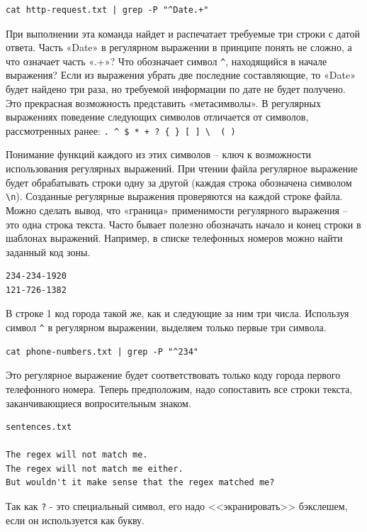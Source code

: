 \documentclass[12pt]{article}
\begin{document}
\begin{verbatim}
cat http-request.txt | grep -P "^Date.+"
\end{verbatim}

При выполнении эта команда найдет и распечатает требуемые три строки с
датой ответа. Часть «Date» в регулярном выражении в принципе понять
не сложно, а что означает часть «.+»? Что обозначает символ
\texttt{\^{}}, находящийся в начале выражения? Если из выражения убрать
две последние составляющие, то «Date» будет найдено три раза, но
требуемой информации по дате не будет получено. Это прекрасная
возможность представить «метасимволы». В регулярных выражениях поведение
следующих символов отличается от символов, рассмотренных ранее:
\texttt{.\ \^{}\ \$\ *\ +\ ?\ \{\ \}\ {[}\ {]}\ \textbackslash{}\ \textbar{}\ (\ )}

Понимание функций каждого из этих символов -- ключ к возможности
использования регулярных выражений. При чтении файла регулярное
выражение будет обрабатывать строки одну за другой (каждая строка
обозначена символом \texttt{\textbackslash{}n}). Созданные регулярные
выражения проверяются на каждой строке файла. Можно сделать вывод, что
«граница» применимости регулярного выражения -- это одна строка текста.
Часто бывает полезно обозначать начало и конец строки в шаблонах
выражений. Например, в списке телефонных номеров можно найти заданный
код зоны.

\begin{verbatim}
234-234-1920
121-726-1382
\end{verbatim}

В строке 1 код города такой же, как и следующие за ним три числа.
Используя символ \texttt{\^{}} в регулярном выражении, выделяем только
первые три символа.

\begin{verbatim}
cat phone-numbers.txt | grep -P "^234"
\end{verbatim}

Это регулярное выражение будет соответствовать только коду города
первого телефонного номера. Теперь предположим, надо сопоставить все
строки текста, заканчивающиеся вопросительным знаком.

\begin{verbatim}
sentences.txt

The regex will not match me.
The regex will not match me either.
But wouldn't it make sense that the regex matched me?
\end{verbatim}

Так как \texttt{?} - это специальный символ, его надо <<экранировать>>
бэкслешем, если он используется как букву.
\end{document}
